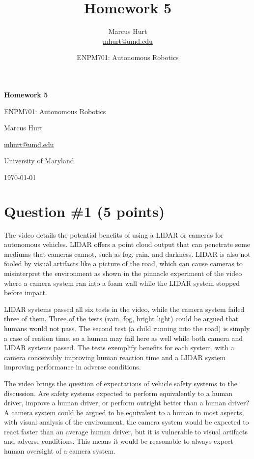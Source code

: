 \documentclass[11pt]{article}
\title{Homework 5}
\author{Marcus Hurt \\ \href{mailto:mhurt@umd.edu}{mhurt@umd.edu}}
\date{ENPM701: Autonomous Robotics}
\begin{document}
\begin{titlepage}
    \centering
    \vspace*{2in}
    {\LARGE\bfseries Homework 5\par}
    \vspace{0.5in}
    {\Large ENPM701: Autonomous Robotics\par}
    \vspace{1in}
    {\large Marcus Hurt\par}
    \href{mailto:mhurt@umd.edu}{mhurt@umd.edu}
    \vfill
    {\large University of Maryland\par}
    {\large \today\par}
\end{titlepage}

\section*{Question \#1 (5 points)}

The video details the potential benefits of using a LIDAR or cameras for autonomous vehicles. LIDAR offers a point cloud output that can penetrate some mediums that cameras cannot, such as fog, rain, and darkness. LIDAR is also not fooled by visual artifacts like a picture of the road, which can cause cameras to misinterpret the environment as shown in the pinnacle experiment of the video where a camera system ran into a foam wall while the LIDAR system stopped before impact.

LIDAR systems passed all six tests in the video, while the camera system failed three of them. Three of the tests (rain, fog, bright light) could be argued that humans would not pass. The second test (a child running into the road) is simply a case of reation time, so a human may fail here as well while both camera and LIDAR systems passed. The tests exemplify benefits for each system, with a camera conceivably improving human reaction time and a LIDAR system improving performance in adverse conditions.

The video brings the question of expectations of vehicle safety systems to the discussion. Are safety systems expected to perform equivalently to a human driver, improve a human driver, or perform outright better than a human driver? A camera system could be argued to be equivalent to a human in most aspects, with visual analysis of the environment, the camera system would be expected to react faster than an average human driver, but it is vulnerable to visual artifacts and adverse conditions. This means it would be reasonable to always expect human oversight of a camera system.
\end{document}
